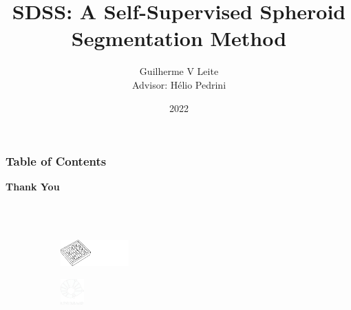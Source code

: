 \documentclass[aspectratio=169,t,xcolor=table]{beamer}
\begin{document}
\title[Inf UFG]{SDSS: A Self-Supervised Spheroid Segmentation
Method}

\author{Guilherme V Leite\\ \bigskip Advisor: Hélio Pedrini}

\date{2022}
\frame[noframenumbering]{\titlepage}



\begin{frame}
    \frametitle{Table of Contents}
    \tableofcontents
\end{frame}


% 
% 
% 
% 
% 
% 

\begin{frame}{}
    
    \centering
    \vspace{2cm}
    
    \textbf{\Huge Thank You}
    
    \ \\
    \ \\
    
    
    \vspace{2cm}
    \begin{figure}
        \centering
        \begin{subfigure}{0.2\textwidth}
            \centering
            \includegraphics[height=1cm]{lib/logos/ic_w.png}
        \end{subfigure}
        \qquad 
        \begin{subfigure}{0.2\textwidth}
            \centering
            \includegraphics[height=1cm]{lib/logos/unicamp_w.png}
        \end{subfigure}
      
    \end{figure}
    
\end{frame}
\titlepage
\end{document}
